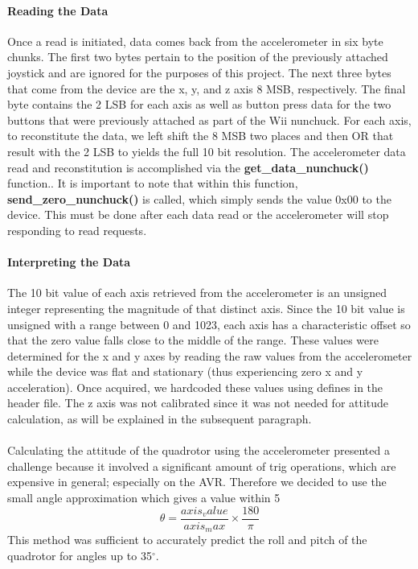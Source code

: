 \paragraph{Reading the Data}
Once a read is initiated, data comes back from the accelerometer in six byte chunks.  The first two bytes pertain to the position of the previously attached joystick and are ignored for the purposes of this project.  The next three bytes that come from the device are the x, y, and z axis 8 MSB, respectively.  The final byte contains the 2 LSB for each axis as well as button press data for the two buttons that were previously attached as part of the Wii nunchuck.  For each axis, to reconstitute the data, we left shift the 8 MSB two places and then OR that result with the 2 LSB to yields the full 10 bit resolution.  The accelerometer data read and reconstitution is accomplished via the {\bf get_data_nunchuck()} function..  It is important to note that within this function, {\bf send_zero_nunchuck()} is called, which simply sends the value 0x00 to the device.  This must be done after each data read or the accelerometer will stop responding to read requests.

\paragraph{Interpreting the Data}
The 10 bit value of each axis retrieved from the accelerometer is an unsigned integer representing the magnitude of that distinct axis.  Since the 10 bit value is unsigned with a range between 0 and 1023, each axis has a characteristic offset so that the zero value falls close to the middle of the range.  These values were determined for the x and y axes by reading the raw values from the accelerometer while the device was flat and stationary (thus experiencing zero x and y acceleration).  Once acquired, we hardcoded these values using defines in the header file.  The z axis was not calibrated since it was not needed for attitude calculation, as will be explained in the subsequent paragraph.

\paragraph{}
Calculating the attitude of the quadrotor using the accelerometer presented a challenge because it involved a significant amount of trig operations, which are expensive in general; especially on the AVR.  Therefore we decided to use the small angle approximation which gives a value within 5%
\begin{equation}
\theta = \frac{axis_value}{axis_max}\times\frac{180}{\pi}
\end{equation}
This method was sufficient to accurately predict the roll and pitch of the quadrotor for angles up to 35$^\circ$.
 
